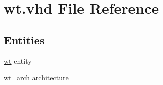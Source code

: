 \hypertarget{wt_8vhd}{}\section{wt.\+vhd File Reference}
\label{wt_8vhd}
\subsection*{Entities}
\begin{DoxyCompactItemize}
\item 
\hyperlink{classwt}{wt} entity
\item 
\hyperlink{classwt_1_1wt__arch}{wt\+\_\+arch} architecture
\end{DoxyCompactItemize}
